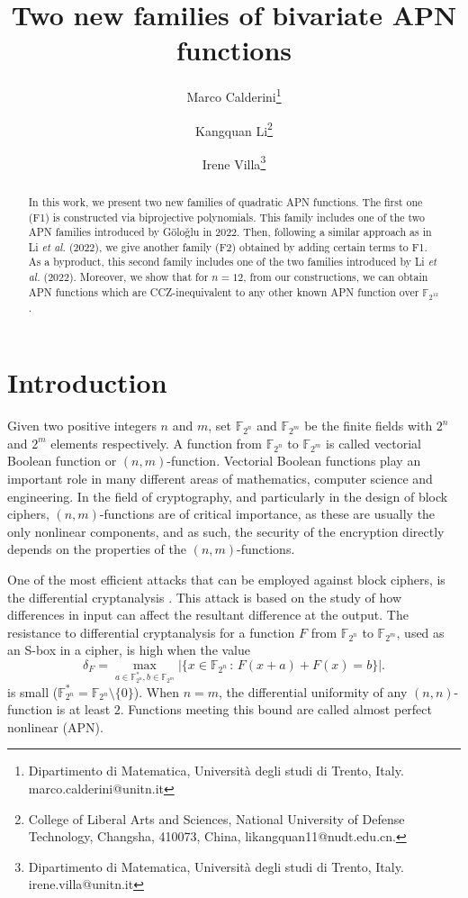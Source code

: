 \documentclass{article}
\title{Two new families of bivariate APN functions}
\author{Marco Calderini\thanks{Dipartimento di Matematica, Universit\`a degli studi di Trento, Italy. marco.calderini@unitn.it} \and Kangquan Li\thanks{College of Liberal Arts and Sciences, National University of Defense Technology, Changsha, 410073, China, likangquan11@nudt.edu.cn.} \and Irene Villa\thanks{Dipartimento di Matematica, Universit\`a degli studi di Trento, Italy. irene.villa@unitn.it} }
\date{}
\begin{document}
\maketitle
\begin{abstract}
    In this work, we present two new families of quadratic APN functions. The first one (F1) is constructed  via biprojective polynomials. This family includes one of the two APN families  introduced by G\"olo\v{g}lu in 2022. Then, following a similar approach as in Li \emph{et al.} (2022), we give another family (F2) obtained by adding  certain terms to F1. As a byproduct, this second family includes one of the two families introduced by  Li \emph{et al.} (2022).    
    Moreover, we show that for $n=12$, from our constructions, we can obtain APN functions  which are CCZ-inequivalent to any other known APN function over $\mathbb{F}_{2^{12}}$.
\end{abstract}

\section{Introduction}

Given two positive integers $n$ and $m$, set $\mathbb F_{2^n}$ and $\mathbb F_{2^m}$ be the finite fields with $2^n$ and $2^m$ elements respectively.
A function from $\mathbb{F}_{2^n}$ to $\mathbb{F}_{2^m}$ is called vectorial Boolean function or $(n,m)$-function. 
Vectorial Boolean functions play an important role in many different areas of mathematics, computer science and engineering. 
In the field of cryptography, and particularly in the design of block ciphers, $(n,m)$-functions are of critical importance, as these are usually the only nonlinear components, and as such, the security of the encryption directly depends on the properties of the $(n,m)$-functions. 

One of the most efficient attacks that can be employed against block ciphers, is the differential cryptanalysis \cite{bihSha1991}. This attack is based on the study of how differences in input can affect the resultant difference at the output. 
The resistance to differential cryptanalysis for a function $F$ from $\mathbb{F}_{2^n}$ to $\mathbb{F}_{2^m}$, used as an S-box in a cipher, is high when the value 
$$
\delta_F = \max_{a\in\mathbb{F}_{2^n}^*,b\in\mathbb{F}_{2^m}} |\{x\in\mathbb{F}_{2^n}\,:\,F(x+a)+F(x)=b\}|.
$$
is small ($\mathbb{F}_{2^n}^*=\mathbb{F}_{2^n}\setminus\{0\}$). When $n = m$, the differential uniformity of any $(n, n)$-function is at least $2$. Functions meeting this bound are called almost perfect nonlinear (APN). 
\end{document}
